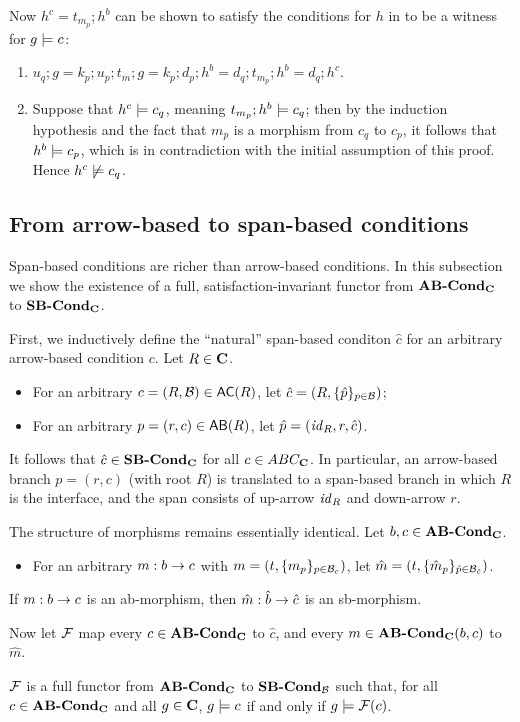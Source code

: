 Now $h^c=t_{m_p};h^b$ can be shown to satisfy the conditions for $h$ in  to be a witness for $g\models c$:
\begin{enumerate}
\item $u_q;g = k_p;u_p;t_m;g= k_p;d_p;h^b = d_q;t_{m_p};h^b=d_q;h^c$.
\item Suppose that $h^c\models c_q$, meaning $t_{m_p};h^b\models c_q$; then by the induction hypothesis and the fact that $m_p$ is a morphism from $c_q$ to $c_p$, it follows that $h^b\models c_p$, which is in contradiction with the initial assumption of this proof. Hence $h^c\not\models c_q$.
\end{enumerate}

\subsection{From arrow-based to span-based conditions}

Span-based conditions are richer than arrow-based conditions. In this subsection we show the existence of a full, satisfaction-invariant functor from $\textbf{AB-Cond}_{\mathbf{C}}$ to $\textbf{SB-Cond}_{\mathbf{C}}$.

First, we inductively define the ``natural'' span-based conditon $\hat c$ for an arbitrary arrow-based condition $c$. Let $R\in\mathbf{C}$.
\begin{itemize}
\item For an arbitrary $c=(R,\cB)\in \AC R$, let $\hat c=(R,\{{\hat p}\}_{p\in\mathcal{B}})$; 
\item For an arbitrary $p=(r,c)\in \AB R$, let $\hat p=(\mathit{id}_R,r,\hat c)$.
\end{itemize}
%
It follows that $\hat c\in \textbf{SB-Cond}_{\mathbf{C}}$ for all $c\in ABC_{\mathbf{C}}$. In particular, an arrow-based branch $p=(r,c)$ (with root $R$) is translated to a span-based branch in which $R$ is the interface, and the span consists of up-arrow $\mathit{id}_R$ and down-arrow $r$.

The structure of morphisms remains essentially identical. Let $b,c\in \textbf{AB-Cond}_{\mathbf{C}}$.
%
\begin{itemize}
\item For an arbitrary $m:b\rightarrow c$ with $m=(t,\{{m_p}\}_{p\in \mathcal{B}_c})$, let $\hat m=(t,\{{\hat m_p}\}_{\hat p\in \mathcal{B}_{\hat c}})$.
\end{itemize}
%
\begin{proposition}
If $m:b\rightarrow c$ is an ab-morphism, then $\hat m:\hat b\rightarrow \hat c$ is an sb-morphism.
\end{proposition}
%
Now let $\mathcal{F}$ map every $c\in \textbf{AB-Cond}_{\mathbf{C}}$ to $\hat c$, and every $m\in \textbf{AB-Cond}_{\mathbf{C}}(b,c)$ to $\hat m$.

\begin{theorem}
$\mathcal{F}$ is a full functor from $\textbf{AB-Cond}_{\mathbf{C}}$ to $\textbf{SB-Cond}_{\mathcal{B}}$ such that, for all $c\in \textbf{AB-Cond}_{\mathbf{C}}$ and all $g\in \mathbf{C}$, $g\models c$ if and only if $g\models \mathcal{F}(c)$.
\end{theorem}




